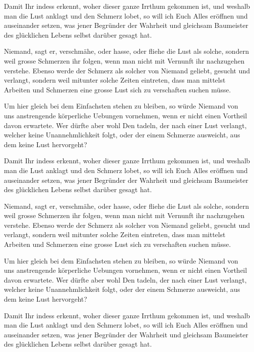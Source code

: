 \documentclass[11pt]{g-brief-jit}
\begin{document}
\sloppy
\begin{g-brief-jit}
Damit Ihr indess erkennt, woher dieser ganze Irrthum gekommen ist, und weshalb man die Lust anklagt und den Schmerz lobet, so will ich Euch Alles eröffnen und auseinander setzen, was jener Begründer der Wahrheit und gleichsam Baumeister des glücklichen Lebens selbst darüber gesagt hat.

Niemand, sagt er, verschmähe, oder hasse, oder fliehe die Lust als solche, sondern weil grosse Schmerzen ihr folgen, wenn man nicht mit Vernunft ihr nachzugehen verstehe. Ebenso werde der Schmerz als solcher von Niemand geliebt, gesucht und verlangt, sondern weil mitunter solche Zeiten eintreten, dass man mittelst Arbeiten und Schmerzen eine grosse Lust sich zu verschaften suchen müsse.

Um hier gleich bei dem Einfachsten stehen zu bleiben, so würde Niemand von uns anstrengende körperliche Uebungen vornehmen, wenn er nicht einen Vortheil davon erwartete. Wer dürfte aber wohl Den tadeln, der nach einer Lust verlangt, welcher keine Unannehmlichkeit folgt, oder der einem Schmerze ausweicht, aus dem keine Lust hervorgeht?

Damit Ihr indess erkennt, woher dieser ganze Irrthum gekommen ist, und weshalb man die Lust anklagt und den Schmerz lobet, so will ich Euch Alles eröffnen und auseinander setzen, was jener Begründer der Wahrheit und gleichsam Baumeister des glücklichen Lebens selbst darüber gesagt hat.

Niemand, sagt er, verschmähe, oder hasse, oder fliehe die Lust als solche, sondern weil grosse Schmerzen ihr folgen, wenn man nicht mit Vernunft ihr nachzugehen verstehe. Ebenso werde der Schmerz als solcher von Niemand geliebt, gesucht und verlangt, sondern weil mitunter solche Zeiten eintreten, dass man mittelst Arbeiten und Schmerzen eine grosse Lust sich zu verschaften suchen müsse.

Um hier gleich bei dem Einfachsten stehen zu bleiben, so würde Niemand von uns anstrengende körperliche Uebungen vornehmen, wenn er nicht einen Vortheil davon erwartete. Wer dürfte aber wohl Den tadeln, der nach einer Lust verlangt, welcher keine Unannehmlichkeit folgt, oder der einem Schmerze ausweicht, aus dem keine Lust hervorgeht?

Damit Ihr indess erkennt, woher dieser ganze Irrthum gekommen ist, und weshalb man die Lust anklagt und den Schmerz lobet, so will ich Euch Alles eröffnen und auseinander setzen, was jener Begründer der Wahrheit und gleichsam Baumeister des glücklichen Lebens selbst darüber gesagt hat.


\end{g-brief-jit}
\end{document}
